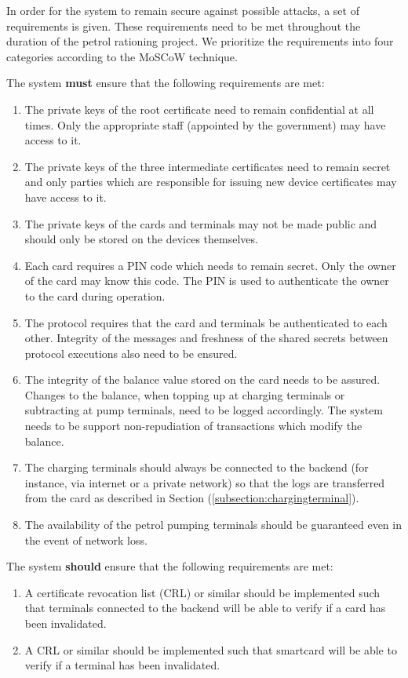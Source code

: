 In order for the system to remain secure against possible attacks, a set of requirements is given. These requirements need to be met throughout the duration of the petrol rationing project. We prioritize the requirements into four categories according to the MoSCoW technique.

The system {\bf must} ensure that the following requirements are met:
\begin{enumerate}
  \item The private keys of the root certificate need to remain confidential at all times. Only the appropriate staff (appointed by the government) may have access to it. 
  \item The private keys of the three intermediate certificates need to remain secret and only parties which are responsible for issuing new device certificates may have access to it.
  \item The private keys of the cards and terminals may not be made public and should only be stored on the devices themselves.
  \item Each card requires a PIN code which needs to remain secret. Only the owner of the card may know this code. The PIN is used to authenticate the owner to the card during operation.
  \item The protocol requires that the card and terminals be authenticated to each other. Integrity of the messages and freshness of the shared secrets between protocol executions also need to be ensured.
  \item The integrity of the balance value stored on the card needs to be assured. Changes to the balance, when topping up at charging terminals or subtracting at pump terminals, need to be logged accordingly. The system needs to be support non-repudiation of transactions which modify the balance.
  \item The charging terminals should always be connected to the backend (for instance, via internet or a private network) so that the logs are transferred from the card as described in Section (\ref{subsection:chargingterminal}).
  \item The availability of the petrol pumping terminals should be guaranteed even in the event of network loss. 
  
\end{enumerate}

The system {\bf should} ensure that the following requirements are met:
\begin{enumerate}
  \item A certificate revocation list (CRL) or similar should be implemented such that terminals connected to the backend will be able to verify if a card has been invalidated.
  \item A CRL or similar should be implemented such that smartcard will be able to verify if a terminal has been invalidated.
\end{enumerate}

